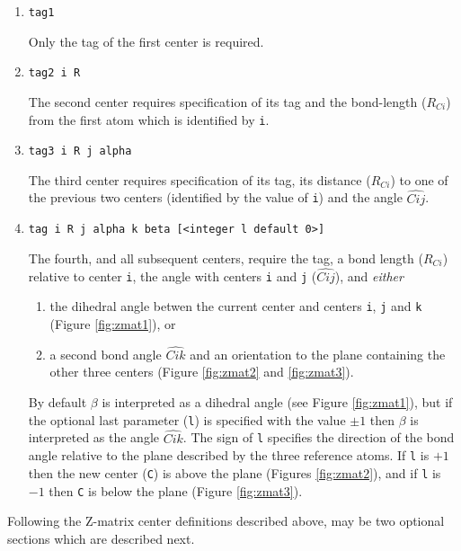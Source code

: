 \begin{enumerate}

   \item \verb+tag1+

   Only  the  tag  of the first center is required.

   \item \verb+tag2 i R+

     The second center requires specification of its tag and the
     bond-length ($R_{Ci}$) from the first atom which is identified by
     \verb+i+.

   \item \verb+tag3 i R j alpha+

     The third center requires specification of its tag, its distance
     ($R_{Ci}$) to one of the previous two centers (identified by the
     value of \verb+i+) and the angle $\widehat{Cij}$.

   \item \verb+tag i R j alpha k beta [<integer l default 0>]+

     The fourth, and all subsequent centers, require the tag, a bond
     length ($R_{Ci}$) relative to center \verb+i+, the angle with
     centers \verb+i+ and \verb+j+ ($\widehat{Cij}$), and {\em either} 
    \begin{enumerate}
    \item the dihedral angle betwen the current center and centers
      \verb+i+, \verb+j+ and \verb+k+ (Figure \ref{fig:zmat1}), or
      \item  a second bond angle $\widehat{Cik}$ and an orientation to 
      the plane containing the other three centers (Figure
      \ref{fig:zmat2} and \ref{fig:zmat3}).
    \end{enumerate}

    By default $\beta$ is interpreted as a dihedral angle (see Figure
    \ref{fig:zmat1}), but if the optional last parameter (\verb+l+) is
    specified with the value $\pm 1$ then $\beta$ is interpreted as
    the angle $\widehat{Cik}$.  The sign of \verb+l+ specifies the
    direction of the bond angle relative to the plane described by the
    three reference atoms.  If \verb+l+ is $+1$ then the new center
    (\verb+C+) is above the plane (Figures \ref{fig:zmat2}), and if
    \verb+l+ is $-1$ then \verb+C+ is below the plane (Figure
    \ref{fig:zmat3}).
\end{enumerate}

Following the Z-matrix center definitions described above, may be two
optional sections which are described next.

